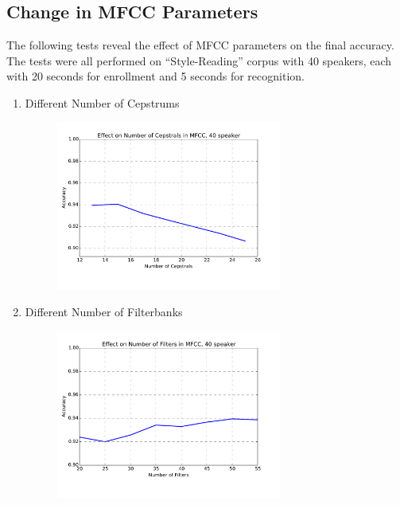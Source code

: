 \subsection{Change in MFCC Parameters}
The following tests reveal the effect of MFCC parameters on the final accuracy.
The tests were all performed on ``Style-Reading'' corpus with 40 speakers, each with 20 seconds for enrollment
and 5 seconds for recognition.
\begin{enumerate}
  \item Different Number of Cepstrums
    \begin{figure}[H]
      \centering
      \includegraphics[width=0.7\textwidth]{img/mfcc-nceps.pdf}
    \end{figure}

  \item Different Number of Filterbanks
    \begin{figure}[H]
      \centering
      \includegraphics[width=0.7\textwidth]{img/mfcc-nfilter.pdf}
    \end{figure}


\end{enumerate}
